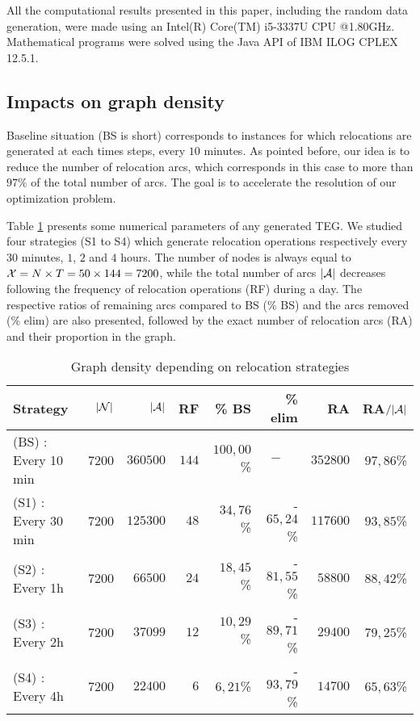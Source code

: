 \begin{bibunit}[ieeetr]
All the computational results presented in this paper, including the random data generation, were made using an Intel(R) Core(TM) i5-3337U CPU @1.80GHz. Mathematical programs were solved using the Java API of IBM ILOG CPLEX 12.5.1.

\subsection{Impacts on graph density}
Baseline situation (BS is short) corresponds to instances for which relocations are generated at each times steps, \ie every $10$ minutes.
As pointed before, our idea is to reduce the number of relocation arcs, which corresponds in this case to more than $97$\% of the total number of arcs.
The goal is to accelerate the resolution of our optimization problem.

Table \ref{table:graphDensity} presents some numerical parameters of any generated TEG.
We studied four strategies (S1 to S4) which generate relocation operations respectively every $30$ minutes, $1$, $2$ and $4$ hours. 
The number of nodes is always equal to ${\cal X}= N \times T = 50 \times 144=7200$, while the total number of arcs $|{\cal A}|$ decreases following the frequency of relocation operations (RF)  during a day. 
The respective ratios of remaining arcs compared to BS (\% BS) and the arcs removed (\% elim) are also presented, followed by the exact number of relocation arcs (RA) and their proportion in the graph.

\begin{table}[h]
\caption{Graph density depending on relocation strategies}
\label{table:graphDensity}
\centering
\begin{tabularx}{\linewidth}{@{\extracolsep{\fill}}lrrrrrrr@{}}
\hline
Strategy  & $|{\cal N}|$ & $|{\cal A}|$  &    RF & \% BS &      \% elim &       RA &    RA$/|{\cal A}|$ \\
\hline
(BS) : Every 10 min  &         7200 &      $360500$ & $144$ &    $100,00$\% &   $-~~~~~~$ & $352800$ & $97,86$\% \\
(S1) : Every 30 min  &         7200 &      $125300$ &  $48$ &     $34,76$\% & - $65,24$\% & $117600$ & $93,85$\% \\
(S2) : Every 1h      &         7200 &       $66500$ &  $24$ &     $18,45$\% & - $81,55$\% &  $58800$ & $88,42$\% \\
(S3) : Every 2h      &         7200 &       $37099$ &  $12$ &     $10,29$\% & - $89,71$\% &  $29400$ & $79,25$\% \\
(S4) : Every 4h      &         7200 &       $22400$ &   $6$ &      $6,21$\% & - $93,79$\% &  $14700$ & $65,63$\% \\
\hline
\end{tabularx}
\end{table}


\end{bibunit}
